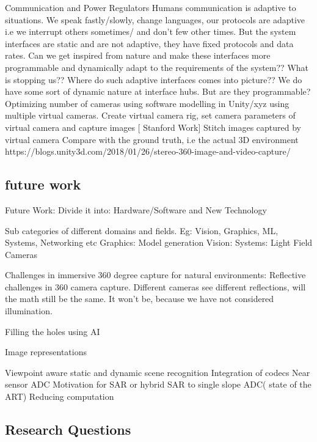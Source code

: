 Communication and Power Regulators
Humans communication is adaptive to situations. We speak fastly/slowly, change languages, our protocols are adaptive i.e we interrupt others sometimes/ and don't few other times. But the system interfaces are static and are not adaptive, they have fixed protocols and data rates. Can we get inspired from nature and make these interfaces more programmable and dynamically adapt to the requirements of the system?? What is stopping us?? 
Where do such adaptive interfaces comes into picture?? We do have some sort of dynamic nature at interface hubs. But are they programmable?
Optimizing number of cameras using software modelling in Unity/xyz using multiple virtual cameras. 
Create virtual camera rig, set camera parameters of virtual camera and capture images [ Stanford Work]
Stitch images captured by virtual camera 
Compare with the ground truth, i.e the actual 3D environment 
https://blogs.unity3d.com/2018/01/26/stereo-360-image-and-video-capture/

\subsection{future work}


Future Work:
Divide it into:
Hardware/Software and New Technology

Sub categories of different domains and fields. 
Eg: Vision, Graphics, ML, Systems, Networking etc
Graphics: Model generation 
Vision: 
Systems: Light Field Cameras

Challenges in immersive 360 degree capture for natural environments:
Reflective challenges in 360 camera capture. Different cameras see different reflections, will the math still be the same. It won't be, because we have not considered illumination. 

Filling the holes using AI

Image representations

Viewpoint aware static and dynamic scene recognition
Integration of codecs 
Near sensor ADC
Motivation for SAR or hybrid SAR to single slope ADC( state of the ART)
Reducing computation 

\subsection{Research Questions}



